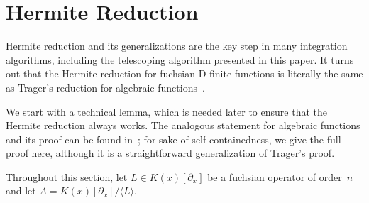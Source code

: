 \documentclass{sig-alternate}
\def\<#1>{\langle#1\rangle}
\begin{document}
\section{Hermite Reduction}\label{sec:hermite}

Hermite reduction and its generalizations are the key step in many integration
algorithms, including the telescoping algorithm presented in this paper. It
turns out that the Hermite reduction for fuchsian D-finite functions is
literally the same as Trager's reduction for algebraic
functions~\cite{trager84}.

We start with a technical lemma, which is needed later to ensure that the
Hermite reduction always works. The analogous statement for algebraic
functions and its proof can be found in~\cite[pp. 46--47]{trager84}; for
sake of self-containedness, we give the full proof here, although it is a
straightforward generalization of Trager's proof.

Throughout this section, let $L\in K(x)[\partial_x]$ be a fuchsian operator
of order~$n$ and let $A=K(x)[\partial_x]/\<L>$.
\end{document}
